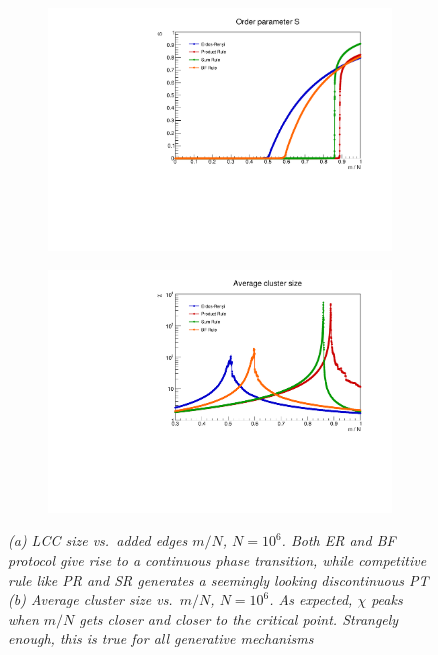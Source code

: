 \begin{figure}
	\centering
	\begin{subfigure}[t]{0.48\linewidth}
		\includegraphics[width=\linewidth]{images/S.pdf}
		\vspace{-28pt}
		\caption{}
		\label{fig::S}
	\end{subfigure}
	\hspace{3pt}
	\begin{subfigure}[t]{0.48\linewidth}
		\includegraphics[width=\linewidth]{images/ACS.pdf}
		\vspace{-28pt}
		\caption{}
		\label{fig::ACS}
	\end{subfigure}
	\vspace{-10pt}
	\caption{\textit{(a) LCC size vs.\ added edges $m/N$, $N = 10^6$. Both ER and BF protocol give rise to a continuous phase transition, while competitive rule like PR and SR generates a seemingly looking discontinuous PT (b) Average cluster size vs.\ $m/N$, $N = 10^6$. As expected, $\chi$ peaks when $m/N$ gets closer and closer to the critical point. Strangely enough, this is true for all generative mechanisms}}
	\vspace{-8pt}
\end{figure}


